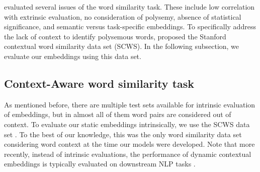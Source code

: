 \citet{faruqui2016problems} evaluated several issues of the word similarity task.
These include low correlation with extrinsic evaluation, no consideration of polysemy, absence of statistical significance, and semantic versus task-specific embeddings. 
To specifically address the lack of context to identify polysemous words, \citet{huang2012improving} proposed the Stanford contextual word similarity data set (SCWS). In the following subsection, we evaluate our embeddings using this data set. 
 

\subsection{Context-Aware word similarity task}

As mentioned before, there are multiple test sets available for intrinsic evaluation of embeddings, but in almost all of them word pairs are considered out of context. 
To evaluate our static embeddings intrinsically, we use the SCWS data set \citep{huang2012improving}. 
To the best of our knowledge, this was the only word similarity data set considering word context at the time our models were developed.
Note that more recently, instead of intrinsic evaluations, the performance of dynamic contextual embeddings is typically evaluated on downstream NLP tasks \citep{peters-etal-2018-deep,devlin-etal-2019-bert}. 


